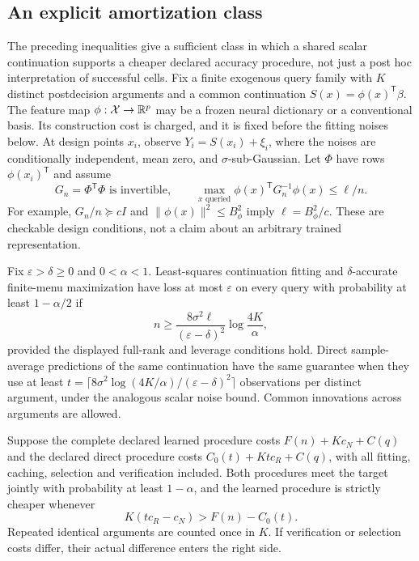 \subsection{An explicit amortization class}
The preceding inequalities give a sufficient class in which a shared scalar
continuation supports a cheaper declared accuracy procedure, not just a
post hoc interpretation of successful cells. Fix a finite exogenous query
family with $K$ distinct postdecision arguments and a common continuation
$S(x)=\phi(x)^{\mathsf T}\beta$. The feature map $\phi:\mathcal X\to\mathbb R^p$
may be a frozen neural dictionary or a conventional basis. Its construction
cost is charged, and it is fixed before the fitting noises below. At design
points $x_i$, observe $Y_i=S(x_i)+\xi_i$, where the noises are conditionally
independent, mean zero, and $\sigma$-sub-Gaussian. Let $\Phi$ have rows
$\phi(x_i)^{\mathsf T}$ and assume
\[
 G_n=\Phi^{\mathsf T}\Phi\text{ is invertible},\qquad
 \max_{x\text{ queried}}\phi(x)^{\mathsf T}G_n^{-1}\phi(x)\leq\ell/n.
\]
For example, $G_n/n\succeq cI$ and $\|\phi(x)\|^2\leq B_\phi^2$
imply $\ell=B_\phi^2/c$. These are checkable design conditions, not a
claim about an arbitrary trained representation.

\begin{corollary}
\label{cor:r19amortization}
Fix $\varepsilon>\delta\geq0$ and $0<\alpha<1$. Least-squares continuation
fitting and $\delta$-accurate finite-menu maximization have loss at most
$\varepsilon$ on every query with probability at least $1-\alpha/2$ if
\begin{equation}
 n\geq \frac{8\sigma^2\ell}{(\varepsilon-\delta)^2}
                    \log\frac{4K}{\alpha},
 \label{eq:r19learnbudget}
\end{equation}
provided the displayed full-rank and leverage conditions hold. Direct
sample-average predictions of the same continuation have the same guarantee
when they use at least
$t=\lceil8\sigma^2\log(4K/\alpha)/(\varepsilon-\delta)^2\rceil$
observations per distinct argument, under the analogous scalar noise bound.
Common innovations across arguments are allowed.

Suppose the complete declared learned procedure costs
$F(n)+Kc_N+C(q)$ and the declared direct procedure costs
$C_0(t)+Kt c_R+C(q)$, with all fitting, caching, selection and verification
included. Both procedures meet the target jointly with probability at least
$1-\alpha$, and the learned procedure is strictly cheaper whenever
\begin{equation}
 K(t c_R-c_N)>F(n)-C_0(t).
 \label{eq:r19explicitadvantage}
\end{equation}
Repeated identical arguments are counted once in $K$. If verification or
selection costs differ, their actual difference enters the right side.
\end{corollary}

